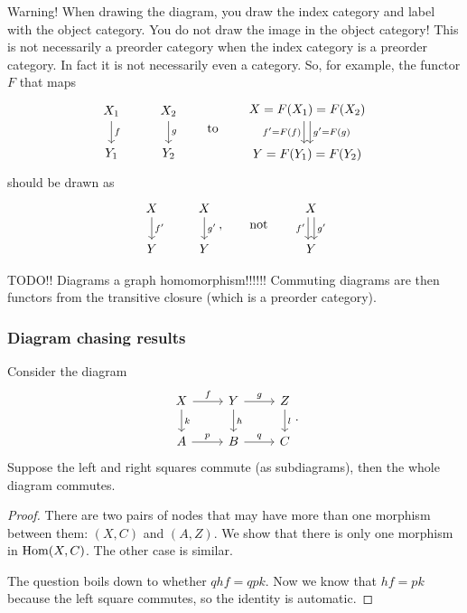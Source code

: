 \begin{example}
Warning! When drawing the diagram, you draw the index category and label with the object category. You do not draw the image in the object category! This is not necessarily a preorder category when the index category is a preorder category. In fact it is not necessarily even a category. So, for example, the functor $F$ that maps
\[ \begin{tikzcd}
X_1 \dar{f} & X_2 \dar{g} \\ Y_1 & Y_2
\end{tikzcd} \qquad\text{to}\qquad \begin{tikzcd}
X = F(X_1) = F(X_2) \ar[d, shift right, swap, "f' = F(f)"] \ar[d, shift left, "g' = F(g)"] \\ Y = F(Y_1) = F(Y_2)
\end{tikzcd}  \]
should be drawn as
\[ \begin{tikzcd}
X \dar{f'} & X \dar{g'} \\ Y & Y
\end{tikzcd}, \qquad\text{not}\qquad \begin{tikzcd}
X \ar[d, swap, shift right, "f'"] \ar[d, shift left, "g'"] \\ Y
\end{tikzcd} \]
\end{example}

TODO!! Diagrams a graph homomorphism!!!!!! Commuting diagrams are then functors from the transitive closure (which is a preorder category).

\subsubsection{Diagram chasing results}
\begin{lemma} \label{commutingRectangle}
Consider the diagram
\[ \begin{tikzcd}
X \rar{f}\dar{k} & Y \rar{g}\dar{h} & Z\dar{l} \\
A \rar{p} & B \rar{q} & C
\end{tikzcd}. \]
Suppose the left and right squares commute (as subdiagrams), then the whole diagram commutes.
\end{lemma}
\begin{proof}
There are two pairs of nodes that may have more than one morphism between them: $(X,C)$ and $(A,Z)$. We show that there is only one morphism in $\operatorname{Hom}(X,C)$. The other case is similar.

The question boils down to whether $qhf = qpk$. Now we know that $hf = pk$ because the left square commutes, so the identity is automatic.
\end{proof}

